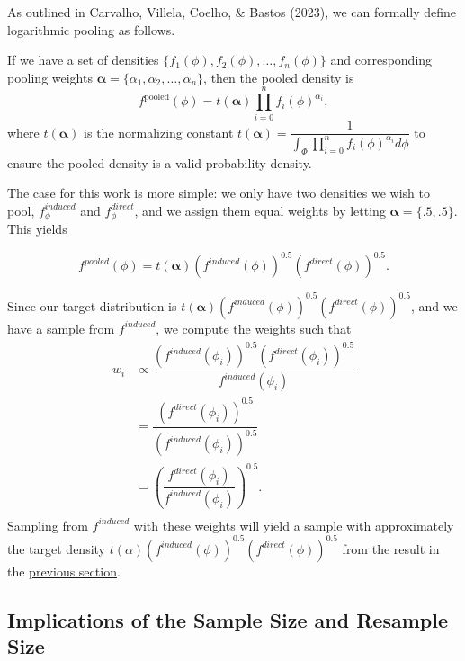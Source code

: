 \documentclass[12pt,twoside]{smiththesis}
\begin{document}
As outlined in Carvalho, Villela, Coelho, \& Bastos (2023), we can formally define logarithmic pooling as follows.

If we have a set of densities \(\{ f_1(\phi), f_2(\phi), \ldots, f_n(\phi)\}\) and corresponding pooling weights \(\boldsymbol{\alpha}=\{\alpha_1, \alpha_2, \ldots, \alpha_n\}\), then the pooled density is
\[f^{\text{pooled}}(\phi) = t(\boldsymbol{\alpha}) \prod_{i=0}^n f_i(\phi)^{\alpha_i},\]
where \(t(\boldsymbol{\alpha})\) is the normalizing constant \(t(\boldsymbol{\alpha}) = \dfrac{1}{ \int_{\Phi}\prod_{i=0}^n f_i(\phi)^{\alpha_i} d\phi}\) to ensure the pooled density is a valid probability density.

The case for this work is more simple: we only have two densities we wish to pool, \(f_\phi^{induced}\) and \(f_\phi^{direct}\), and we assign them equal weights by letting \(\boldsymbol{\alpha} = \{.5, .5\}\). This yields

\[f^{pooled}(\phi) = t(\boldsymbol \alpha) \left( f^{induced} (\phi) \right)^{0.5} \left( f^{direct} (\phi) \right)^{0.5}.\]

Since our target distribution is \(t(\boldsymbol \alpha) \left( f^{induced} (\phi) \right)^{0.5} \left( f^{direct} (\phi) \right)^{0.5}\), and we have a sample from \(f^{induced}\), we compute the weights such that
\begin{align*} w_i &\propto \dfrac{ \left( f^{induced} (\phi_i) \right)^{0.5} \left( f^{direct} (\phi_i) \right)^{0.5} } {f^{induced}(\phi_i)} \\
&=  \dfrac{ \left( f^{direct} (\phi_i) \right)^{0.5} } {\left( f^{induced} (\phi_i) \right)^{0.5} } \\
&=   \left( \dfrac{  f^{direct} (\phi_i) } { f^{induced} (\phi_i) }  \right)^{0.5}. \\
\end{align*}
Sampling from \(f^{induced}\) with these weights will yield a sample with approximately the target density \(t(\alpha) \left(f^{induced} (\phi) \right)^{0.5} \left( f^{direct} (\phi)\right)^{0.5}\) from the result in the \protect\hyperlink{proof}{previous section}.

\hypertarget{presamp}{%
\subsection{Implications of the Sample Size and Resample Size}\label{presamp}}
\end{document}
